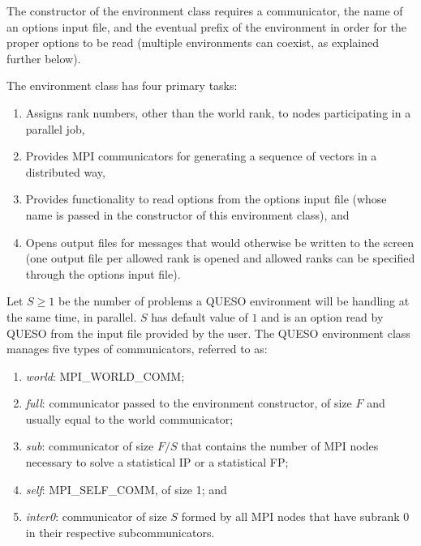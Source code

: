 The constructor of the environment class requires a communicator, the name of an options input file,
and the eventual prefix of the environment in order for the proper options to be read (multiple environments can coexist, as explained further below).

The environment class has four primary tasks:
\begin{enumerate}
\item Assigns rank numbers, other than the world rank, to nodes participating in a parallel job,
\item Provides MPI communicators for generating a sequence of vectors in a distributed way,
\item Provides functionality to read options from the options input file (whose name is passed in the constructor of this environment class), and
\item Opens output files for messages that would otherwise be written to the screen (one output file per allowed rank is opened and allowed ranks can be specified through the options input file).
\end{enumerate}




Let $S \geqslant 1$ be the number of problems a QUESO environment will be handling at the same time, in parallel.
$S$ has default value of $1$ and is an option read by QUESO from the input file provided by the user.
The QUESO environment class manages five types of communicators, referred to as:

\begin{enumerate}

\item {\it world}: MPI\_WORLD\_COMM;
\item {\it full}: communicator passed to the environment constructor, of size $F$ and usually equal to the world communicator;
\item {\it sub}: communicator of size $F/S$ that contains the number of MPI nodes necessary to solve a statistical IP or a statistical FP;
\item {\it self}: MPI\_SELF\_COMM, of size 1; and
\item {\it inter0}: communicator of size $S$ formed by all MPI nodes that have subrank 0 in their respective subcommunicators.
 
\end{enumerate}


